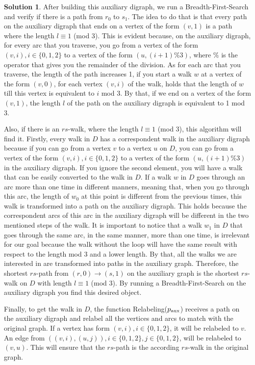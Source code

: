 \documentclass[11pt,leqno,final]{amsart}
\theoremstyle{definition}
\newtheorem{solution}{Solution}
\begin{document}
\begin{solution}
  After building this auxiliary digraph, we run a Breadth-First-Search and verify if there is a path from $r_0$ to $s_1$. The idea to do that is that every path on the auxiliary digraph that ends on a vertex of the form $(v,1)$ is a path where the length $l \equiv 1$ (mod 3). This is evident because, on the auxiliary digraph, for every arc that you traverse, you go from a vertex of the form $(v,i), i \in \{0,1,2\}$ to a vertex of the form $(u, (i+1)\%3)$, where $\%$ is the operator that gives you the remainder of the division. As for each arc that you traverse, the length of the path increases 1, if you start a walk $w$ at a vertex of the form $(v,0)$, for each vertex $(v,i)$ of the walk, holds that the length of $w$ till this vertex is equivalent to $i$ mod 3. By that, if we end on a vertex of the form $(v,1)$, the length $l$ of the path on the auxiliary digraph is equivalent to 1 mod 3.

  Also, if there is an $rs$-walk, where the length $l \equiv 1$ (mod 3), this algorithm will find it. Firstly, every walk in $D$ has a correspondent walk in the auxiliary digraph because if you can go from a vertex $v$ to a vertex $u$ on $D$, you can go from a vertex of the form $(v,i), i \in \{0,1,2\}$ to a vertex of the form $(u,(i+1)\%3)$ in the auxiliary digraph. If you ignore the second element, you will have a walk that can be easily converted to the walk in $D$. If a walk $w$ in $D$ goes through an arc more than one time in different manners, meaning that, when you go through this arc, the length of $w_0$ at this point is different from the previous times, this walk is transformed into a path on the auxiliary digraph. This holds because the correspondent arcs of this arc in the auxiliary digraph will be different in the two mentioned steps of the walk. It is important to notice that a walk $w_1$ in $D$ that goes through the same arc, in the same manner, more than one time, is irrelevant for our goal because the walk without the loop will have the same result with respect to the length mod 3 and a lower length. By that, all the walks we are interested in are transformed into paths in the auxiliary graph. Therefore, the shortest $rs$-path from $(r,0) \to (s,1)$ on the auxiliary graph is the shortest $rs$-walk on $D$ with length $l \equiv 1$ (mod 3). By running a Breadth-First-Search on the auxiliary digraph you find this desired object.

  Finally, to get the walk in $D$, the function Relabeling($p_{\textnormal{aux}}$) receives a path on the auxiliary digraph and relabel all the vertices and arcs to match with the original graph. If a vertex has form $(v,i), i \in \{0,1,2\}$, it will be relabeled to $v$. An edge from $((v,i),(u,j)), i \in \{0,1,2\}, j \in \{0,1,2\}$, will be relabeled to $(v,u)$. This will ensure that the $rs$-path is the according $rs$-walk in the original graph.

\end{solution}
\end{document}
